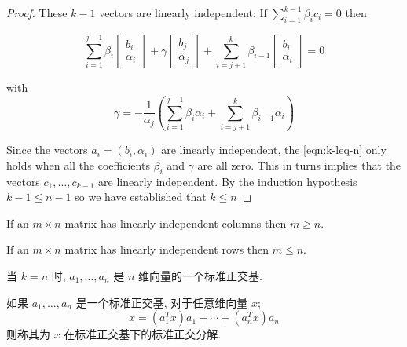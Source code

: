 \begin{proof}
     These $ k-1 $ vectors are linearly independent: If $ \sum_{i=1}^{k-1} \beta_{i} c_{i}=0 $ then

    \begin{equation}
        \label{eqn:k-leq-n}
        \sum_{i=1}^{j-1} \beta_{i}\left[\begin{array}{c}
        b_{i} \\
        \alpha_{i}
        \end{array}\right]+\gamma\left[\begin{array}{c}
        b_{j} \\
        \alpha_{j}
        \end{array}\right]+\sum_{i=j+1}^{k} \beta_{i-1}\left[\begin{array}{c}
        b_{i} \\
        \alpha_{i}
        \end{array}\right]=0
    \end{equation}

    with
    $$
    \gamma=-\frac{1}{\alpha_{j}}\left(\sum_{i=1}^{j-1} \beta_{i} \alpha_{i}+\sum_{i=j+1}^{k} \beta_{i-1} \alpha_{i}\right)
    $$

    Since the vectors $ a_{i}=\left(b_{i}, \alpha_{i}\right) $ are linearly independent, the \cref{eqn:k-leq-n} only holds when all the coefficients $ \beta_{i} $ and $ \gamma $ are all zero. This in turns implies that the vectors $ c_{1}, \ldots, c_{k-1} $ are linearly independent. By the induction hypothesis $ k-1 \leq n-1 $ so we have established that $ k \leq n $
\end{proof}

\begin{corollary}
    If an $ m \times n $ matrix has linearly independent columns then $ m \geq n $. 
\end{corollary}

\begin{corollary}
    If an $ m \times n $ matrix has linearly independent rows then $ m \leq n $.
\end{corollary}

\begin{definition}[$n$维向量的一个标准正交基]
    当 $ k=n $ 时,  $ a_{1}, \ldots, a_{n} $ 是 $ n $ 维向量的一个标准正交基. 
\end{definition}

\begin{definition}[ $ x $ 在标准正交基下的标准正交分解]
    如果 $ a_{1}, \ldots, a_{n} $ 是一个标准正交基, 对于任意维向量 $ x $;
$$
x=\left(a_{1}^{T} x\right) a_{1}+\cdots+\left(a_{n}^{T} x\right) a_{n}
$$
则称其为 $ x $ 在标准正交基下的标准正交分解. 
\end{definition}

